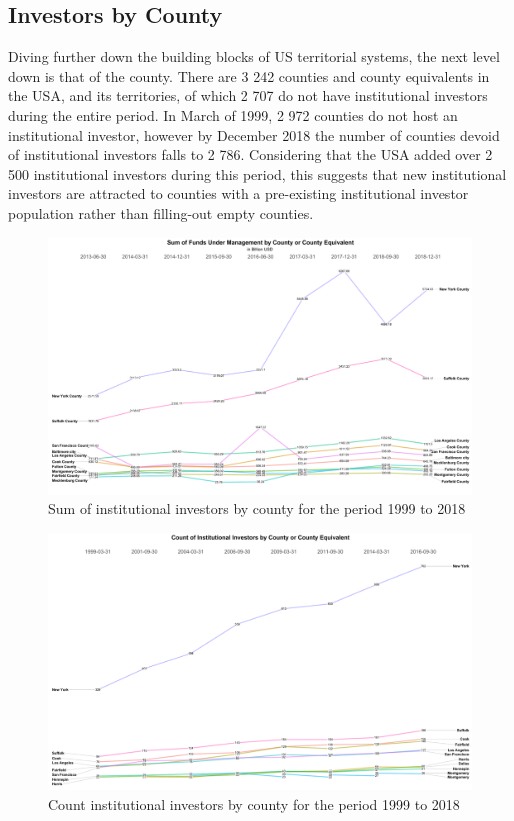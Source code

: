 \subsection{Investors by County}
\label{investorsbycounty}
Diving further down the building blocks of US territorial systems, the next level down is that of the county. There are 3 242 counties and county equivalents in the USA, and its territories,  of which 2 707 do not have institutional investors during the entire period. In March of 1999, 2 972 counties do not host an institutional investor, however by December 2018 the number of counties devoid of institutional investors falls to 2 786.  Considering that the USA added over 2 500 institutional investors during this period, this suggests that new institutional investors are attracted to counties with a pre-existing institutional investor population rather than filling-out empty counties.  



\begin{figure}
	\centering
	\includegraphics[width=1\linewidth]{Figures/ChapterIII/Sum_by_County}
	\caption[Sum of Institutional Investors by County]{Sum of institutional investors by county for the period 1999 to 2018}
	\label{fig:sumbycounty}
\end{figure}


\begin{figure}
	\centering
	\includegraphics[width=1\linewidth]{Figures/ChapterIII/Count_by_County}
	\caption[Count  of Institutional Investors by County]{Count institutional investors by county for the period 1999 to 2018}
	\label{fig:countbycounty}
\end{figure}


